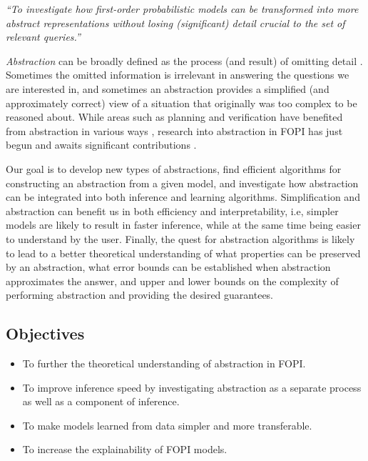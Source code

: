\documentclass[11pt,english,twocolumn]{article}
\begin{document}
\emph{``To investigate how first-order probabilistic models can be transformed
  into more abstract representations without losing (significant) detail
  crucial to the set of relevant queries.''}

\emph{Abstraction} can be broadly defined as the process (and result) of
omitting detail \cite{doi:10.1086/670300}. Sometimes the omitted information is
irrelevant in answering the questions we are interested in, and sometimes an
abstraction provides a simplified (and approximately correct) view of a
situation that originally was too complex to be reasoned about. While areas such
as planning and verification have benefited from abstraction in various ways
\cite{saitta2013abstraction}, research into abstraction in FOPI has just begun
and awaits significant contributions
\cite{DBLP:journals/corr/abs-1810-02434,DBLP:conf/icml/HoltzenBM18,DBLP:conf/uai/HoltzenMB17}.

Our goal is to develop new types of abstractions, find efficient
algorithms for constructing an abstraction from a given model, and investigate
how abstraction can be integrated into both inference and learning algorithms.
Simplification and abstraction can benefit us in both efficiency and
interpretability, i.e, simpler models are likely to result in faster inference,
while at the same time being easier to understand by the user. Finally, the
quest for abstraction algorithms is likely to lead to a better theoretical
understanding of what properties can be preserved by an abstraction, what error
bounds can be established when abstraction approximates the answer, and upper
and lower bounds on the complexity of performing abstraction and providing the
desired guarantees.

\subsection*{Objectives}

\begin{itemize}
\item To further the theoretical understanding of abstraction in FOPI.
\item To improve inference speed by investigating abstraction as a separate
  process as well as a component of inference.
\item To make models learned from data simpler and more transferable.
\item To increase the explainability of FOPI models.
\end{itemize}
\end{document}

